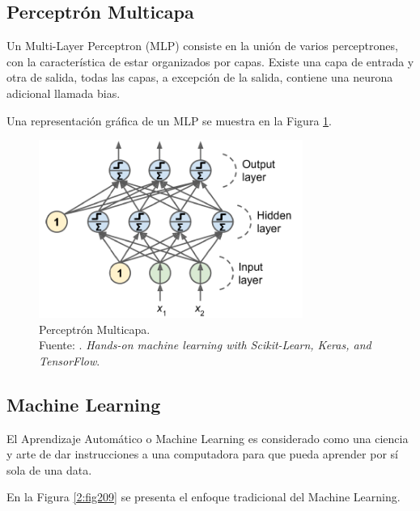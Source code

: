 \subsection{Perceptrón Multicapa}
Un Multi-Layer Perceptron (MLP) consiste en la unión de varios perceptrones, con la característica de estar organizados por capas. Existe una capa de entrada y otra de salida, todas las capas, a excepción de la salida, contiene una neurona adicional llamada bias. \parencite{bk_geron2022handml}

Una representación gráfica de un MLP se muestra en la Figura \ref{2:fig208}.

\begin{figure}[H]
	\begin{center}
		\includegraphics[width=0.77\textwidth]{2/figures/mlp.png}
		\caption[Perceptrón Multicapa]{Perceptrón Multicapa. \\
		Fuente: \cite{bk_geron2022handml}. \textit{Hands-on machine learning with Scikit-Learn, Keras, and TensorFlow}.}
		\label{2:fig208}
	\end{center}
\end{figure}


\subsection{Machine Learning}
El Aprendizaje Automático o Machine Learning es considerado como una ciencia y arte de dar instrucciones a una computadora para que pueda aprender por sí sola de una data. \parencite{bk_geron2022handml}

En la Figura \ref{2:fig209} se presenta el enfoque tradicional del Machine Learning.

